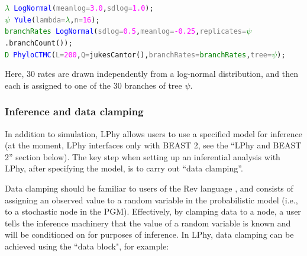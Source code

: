 \documentclass[10pt,letterpaper,table]{article}
\begin{document}
{
\small
\begin{alltt}
  \textcolor{green}{\(\lambda\)} ~ \textcolor{blue}{LogNormal}(\textcolor{gray}{meanlog=}\textcolor{magenta}{3.0}, \textcolor{gray}{sdlog=}\textcolor{magenta}{1.0});
  \textcolor{green}{\(\psi\)} ~ \textcolor{blue}{Yule}(\textcolor{gray}{lambda=}\textcolor{green}{\(\lambda\)}, \textcolor{gray}{n=}\textcolor{magenta}{16});
  \textcolor{green}{branchRates} ~ \textcolor{blue}{LogNormal}(\textcolor{gray}{sdlog=}\textcolor{magenta}{0.5}, \textcolor{gray}{meanlog=}\textcolor{magenta}{-0.25}, \textcolor{gray}{replicates=}\textcolor{green}{\(\psi\)}.\textcolor{magenta!80!black}{branchCount}());
  \textcolor{green}{D} ~ \textcolor{blue}{PhyloCTMC}(\textcolor{gray}{L=}\textcolor{magenta}{200}, \textcolor{gray}{Q=}\textcolor{magenta!80!black}{jukesCantor}(), \textcolor{gray}{branchRates=}\textcolor{green}{branchRates}, \textcolor{gray}{tree=}\textcolor{green}{\(\psi\)});
\end{alltt}
}

Here, 30 rates are drawn independently from a log-normal distribution, and then each is assigned to one of the 30 branches of tree $\psi$.

\subsubsection{Inference and data clamping}
\label{sec:dataclamping}
In addition to simulation, LPhy allows users to use a specified model for inference (at the moment, LPhy interfaces only with BEAST 2, see the ``LPhy and BEAST 2'' section below). The key step when setting up an inferential analysis with LPhy, after specifying the model, is to carry out ``data clamping''.

Data clamping should be familiar to users of the Rev language \cite{revbayes}, and consists of assigning an observed value to a random variable in the probabilistic model (i.e., to a stochastic node in the PGM). Effectively, by clamping data to a node, a user tells the inference machinery that the value of a random variable is known and will be conditioned on for purposes of inference. In LPhy, data clamping can be achieved using the ``data block", for example:
\end{document}

